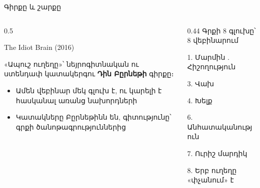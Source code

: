 \begin{frame}{Գիրքը և շարքը}
  \begin{columns}[T]
    \begin{column}{0.5\textwidth}
      \begin{card}
        {\blackfont\Large The Idiot Brain} {\small (2016)}\par
        «Ապուշ ուղեղը»՝ նեյրոգիտնական ու ստենդափ կատակերգու \textbf{Դին Բըրնեթի} գիրքը։\par\medskip
        \begin{itemize}
          \item Ամեն վեբինար մեկ գլուխ է, ու կարելի է հասկանալ առանց նախորդների
          \item Կատակները Բըրնեթինն են, գիտությունը՝ գրքի ծանոթագրություններից
        \end{itemize}
      \end{card}
    \end{column}
    \begin{column}{0.44\textwidth}
      {\blackfont\small Գրքի 8 գլուխը՝ 8 վեբինարում}\par\smallskip
      {\small\color{plum!60!cream}
      1. Մարմին . Հիշողություն\par
      3. Վախ\par
      4. Խելք\par}
      \smallskip
      \par
      \smallskip
      {\small\color{plum!60!cream}
      6. Անհատականություն\par
      7. Ուրիշ մարդիկ\par
      8. Երբ ուղեղը «փչանում» է\par}
    \end{column}
  \end{columns}
\end{frame}

